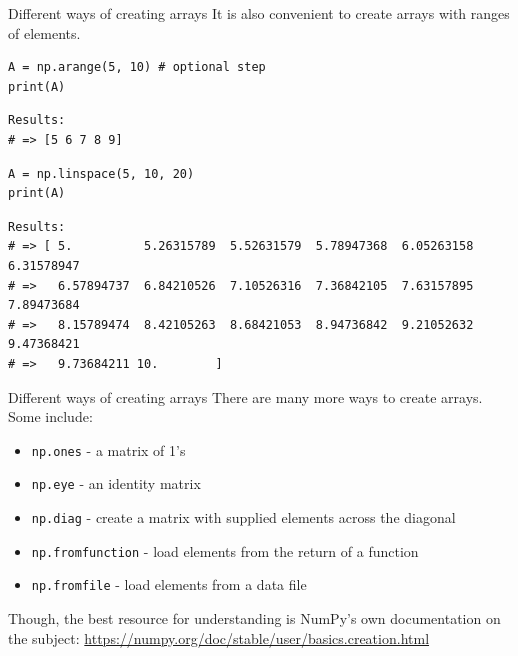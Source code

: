 \documentclass[10pt]{beamer}
\begin{document}
\begin{frame}[label={sec:org61991e3},fragile]{Different ways of creating arrays}
 It is also convenient to create arrays with ranges of elements.

\begin{verbatim}
A = np.arange(5, 10) # optional step
print(A)
\end{verbatim}

\begin{verbatim}
Results: 
# => [5 6 7 8 9]
\end{verbatim}


\begin{verbatim}
A = np.linspace(5, 10, 20)
print(A)
\end{verbatim}

\begin{verbatim}
Results: 
# => [ 5.          5.26315789  5.52631579  5.78947368  6.05263158  6.31578947
# =>   6.57894737  6.84210526  7.10526316  7.36842105  7.63157895  7.89473684
# =>   8.15789474  8.42105263  8.68421053  8.94736842  9.21052632  9.47368421
# =>   9.73684211 10.        ]
\end{verbatim}
\end{frame}


\begin{frame}[label={sec:org1e8d82a},fragile]{Different ways of creating arrays}
 There are many more ways to create arrays. Some include:

\begin{itemize}
\item \texttt{np.ones}  - a matrix of 1's
\item \texttt{np.eye} - an identity matrix
\item \texttt{np.diag} - create a matrix with supplied elements across the diagonal
\item \texttt{np.fromfunction} - load elements from the return of a function
\item \texttt{np.fromfile} - load elements from a data file
\end{itemize}

Though, the best resource for understanding is NumPy's own documentation on the
subject: \url{https://numpy.org/doc/stable/user/basics.creation.html}
\end{frame}
\end{document}
